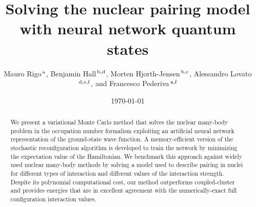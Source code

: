 \documentclass[aps,pre,floatfix,showpacs,twocolumn, preprintnumbers]{revtex4-1}
\begin{document}
\title{Solving the nuclear pairing model with neural network quantum states}
\author{ {Mauro} Rigo$^{\, {\rm a} }$,
{Benjamin} Hall$^{\, {\rm b,d} }$,
{Morten} Hjorth-Jensen$^{\, {\rm b,c} }$,
{Alessandro} Lovato$^{\, {\rm d, e, f} }$, and
{Francesco} Pederiva$^{\, {\rm a, f} }$
}

\date{\today}

\begin{abstract}
We present a variational Monte Carlo method that solves the nuclear many-body problem in the occupation number formalism exploiting an artificial neural network representation of the ground-state wave function. A memory-efficient version of the stochastic reconfiguration algorithm is developed to train the network by minimizing the expectation value of the Hamiltonian. We benchmark this approach against widely used nuclear many-body methods by solving a model used to describe pairing in nuclei for different types of interaction and different values of the interaction strength. Despite its polynomial computational cost, our method outperforms coupled-cluster and provides energies that are in excellent agreement with the numerically-exact full configuration interaction values. 
\end{abstract}

\maketitle
\end{document}
